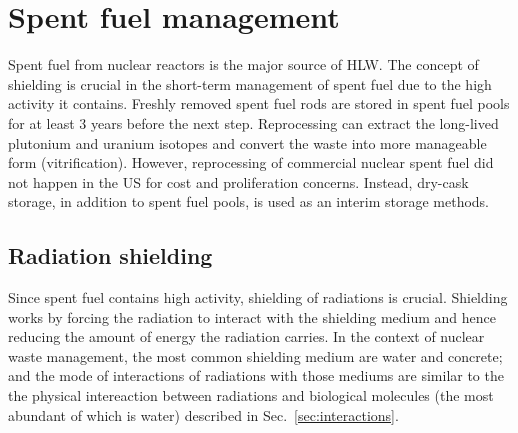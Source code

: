 \documentclass[nofootinbib,preprint,aps]{revtex4-1}
\begin{document}
    \section{Spent fuel management}
    \label{sec:temp}
    Spent fuel from nuclear reactors is the major source of HLW.
    The concept of shielding is crucial in the short-term management of spent fuel due to the high activity
    it contains. Freshly removed spent fuel rods are stored in spent fuel pools for at least $3$ years before
    the next step. Reprocessing can extract the long-lived plutonium and uranium isotopes and
    convert the waste into more manageable form (vitrification). However, reprocessing of commercial
    nuclear spent fuel did not happen in the US for cost and proliferation concerns. Instead, dry-cask
    storage, in addition to spent fuel pools, is used as an interim storage methods.
    \subsection{Radiation shielding}
    Since spent fuel contains high activity, shielding of radiations is crucial. Shielding works by
    forcing the radiation to interact with the shielding medium and hence reducing the amount of energy
    the radiation carries. In the context of nuclear waste management, the most common shielding medium
    are water and concrete; and the mode of interactions of radiations with those mediums are similar to
    the the physical intereaction between radiations and biological molecules (the most abundant of which is
    water) described in Sec.~\ref{sec:interactions}.
\end{document}
